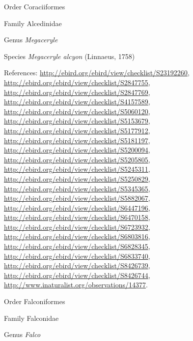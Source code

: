 \documentclass[9pt, article]{memoir}
\begin{document}
\begin{multicols}{2}
\vspace{6pt}\noindent\hspace{18pt}Order Coraciiformes


\vspace{6pt}\noindent\hspace{24pt}Family Alcedinidae


\vspace{6pt}\noindent\hspace{30pt}Genus \textit{Megaceryle}


\vspace{6pt}\noindent\hspace{36pt}Species \textit{Megaceryle alcyon} (Linnaeus, 1758)


\vspace{6pt}References: 
\url{http://ebird.org/ebird/view/checklist/S23192260}, 
\url{http://ebird.org/ebird/view/checklist/S2847755}, 
\url{http://ebird.org/ebird/view/checklist/S2847769}, 
\url{http://ebird.org/ebird/view/checklist/S4157589}, 
\url{http://ebird.org/ebird/view/checklist/S5060120}, 
\url{http://ebird.org/ebird/view/checklist/S5153679}, 
\url{http://ebird.org/ebird/view/checklist/S5177912}, 
\url{http://ebird.org/ebird/view/checklist/S5181197}, 
\url{http://ebird.org/ebird/view/checklist/S5200094}, 
\url{http://ebird.org/ebird/view/checklist/S5205805}, 
\url{http://ebird.org/ebird/view/checklist/S5245311}, 
\url{http://ebird.org/ebird/view/checklist/S5250829}, 
\url{http://ebird.org/ebird/view/checklist/S5345365}, 
\url{http://ebird.org/ebird/view/checklist/S5882067}, 
\url{http://ebird.org/ebird/view/checklist/S6447196}, 
\url{http://ebird.org/ebird/view/checklist/S6470158}, 
\url{http://ebird.org/ebird/view/checklist/S6723932}, 
\url{http://ebird.org/ebird/view/checklist/S6803816}, 
\url{http://ebird.org/ebird/view/checklist/S6828345}, 
\url{http://ebird.org/ebird/view/checklist/S6833740}, 
\url{http://ebird.org/ebird/view/checklist/S8426739}, 
\url{http://ebird.org/ebird/view/checklist/S8426744}, 
\url{http://www.inaturalist.org/observations/14377}.

\vspace{6pt}\noindent\hspace{18pt}Order Falconiformes


\vspace{6pt}\noindent\hspace{24pt}Family Falconidae


\vspace{6pt}\noindent\hspace{30pt}Genus \textit{Falco}



\end{multicols}
\end{document}
